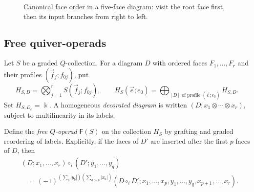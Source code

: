 \documentclass[11pt,letterpaper]{article}
\numberwithin{equation}{section}
\theoremstyle{plain}
\theoremstyle{definition}
\theoremstyle{remark}
\begin{document}
\begin{figure}[htbp]
\centering
{}
\caption{Canonical face order in a five-face diagram: visit the root face first, then its input branches from right to left.}
\label{figure_decorated_diagram}
\end{figure}

\subsection{Free quiver-operads}
\label{sss_free_Q_operads}
Let $S$ be a graded $Q$-collection. For a diagram $D$ with ordered faces
$F_1,\ldots,F_r$ and their profiles $(\vec f_j;f_{0j})$, put
\begin{equation}\label{eq_decorated_diagram_collection}
 H_{S,D}=\bigotimes_{j=1}^r S(\vec f_j;f_{0j}),\qquad
 H_S(\vec e;e_0)=\bigoplus_{[D]\text{ of profile }(\vec e;e_0)}H_{S,D}.
\end{equation}
Set $H_{S,D_e}=\Bbbk$. A homogeneous \textit{decorated diagram} is written
$(D;x_1\otimes\cdots\otimes x_r)$, subject to multilinearity in its labels.

Define the \textit{free $Q$-operad} $\mathsf F(S)$ on the collection $H_S$ by grafting and graded
reordering of labels. Explicitly, if the faces of $D'$ are inserted
after the first $p$ faces of $D$, then
\[
\begin{aligned}
 &(D;x_1,\ldots,x_r)\circ_i(D';y_1,\ldots,y_q)\\
 &\quad=(-1)^{(\sum_b|y_b|)(\sum_{a>p}|x_a|)}
 (D\circ_iD';x_1,\ldots,x_p,y_1,\ldots,y_q,x_{p+1},\ldots,x_r).
\end{aligned}
\]
\end{document}
